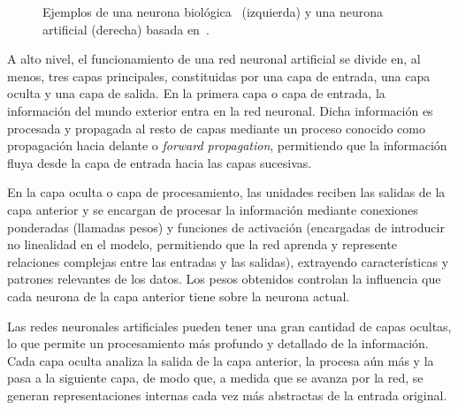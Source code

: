 \begin{figure}[h]
    \centering
    \hfill
    \caption[Ejemplos de neurona biológica~\cite{Neves2018} y neurona artificial (basada en~\cite{Li2024}).]{Ejemplos de una neurona biológica~\cite{Neves2018} (izquierda) y una neurona artificial (derecha) basada en~\cite{Li2024}.}\label{fig:neuronasbioyartificial}
\end{figure}

A alto nivel, el funcionamiento de una red neuronal artificial se divide en, al menos, tres capas principales, constituidas por una capa de entrada, una capa oculta y una capa de salida. En la primera capa o capa de entrada, la información del mundo exterior entra en la red neuronal. Dicha información es procesada y propagada al resto de capas mediante un proceso conocido como propagación hacia delante o \emph{forward propagation}, permitiendo que la información fluya desde la capa de entrada hacia las capas sucesivas.

En la capa oculta o capa de procesamiento, las unidades reciben las salidas de la capa anterior y se encargan de procesar la información mediante conexiones ponderadas (llamadas pesos) y funciones de activación (encargadas de introducir no linealidad en el modelo, permitiendo que la red aprenda y represente relaciones complejas entre las entradas y las salidas), extrayendo características y patrones relevantes de los datos. Los pesos obtenidos controlan la influencia que cada neurona de la capa anterior tiene sobre la neurona actual.

Las redes neuronales artificiales pueden tener una gran cantidad de capas ocultas, lo que permite un procesamiento más profundo y detallado de la información. Cada capa oculta analiza la salida de la capa anterior, la procesa aún más y la pasa a la siguiente capa, de modo que, a medida que se avanza por la red, se generan representaciones internas cada vez más abstractas de la entrada original.

